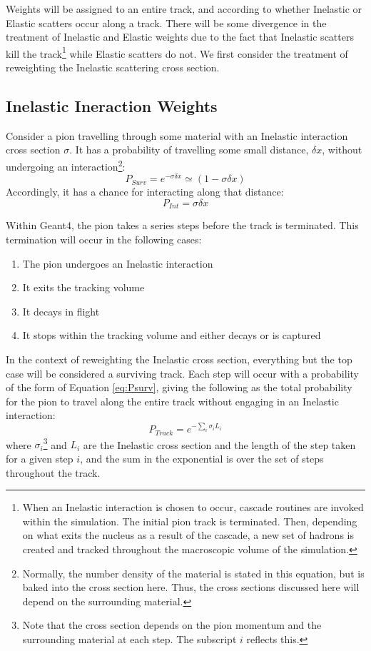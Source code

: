 \documentclass[12pt]{article}
\begin{document}
Weights will be assigned to an entire track, and according to whether Inelastic or Elastic scatters occur along a track. There will be some divergence in the treatment of Inelastic and Elastic weights due to the fact that Inelastic scatters kill the track\footnote{When an Inelastic interaction is chosen to occur, cascade routines are invoked within the simulation. The initial pion track is terminated. Then, depending on what exits the nucleus as a result of the cascade, a new set of hadrons is created and tracked throughout the macroscopic volume of the simulation.} while Elastic scatters do not. We first consider the treatment of reweighting the Inelastic scattering cross section.

\subsection{Inelastic Ineraction 
Weights}\label{subsec:inel_weights}

Consider a pion travelling through some material with an Inelastic interaction cross section $\sigma$. It has a probability of travelling some small distance, $\delta x$, without undergoing an interaction\footnote{Normally, the number density of the material is stated in this equation, but is baked into the cross section here. Thus, the cross sections discussed here will depend on the surrounding material.}:
\begin{equation}\label{eq:Psurv}
P_{Surv} = e^{- \sigma \delta x} \simeq (1 - \sigma \delta x)
\end{equation}
Accordingly, it has a chance for interacting along that distance:
\begin{equation}\label{eq:Pint}
P_{Int} = \sigma \delta x
\end{equation}

Within Geant4, the pion takes a series steps before the track is terminated. This termination will occur in the following cases:
\begin{enumerate}
\item The pion undergoes an Inelastic interaction
\item It exits the tracking volume
\item It decays in flight
\item It stops within the tracking volume and either decays or is captured
\end{enumerate}
In the context of reweighting the Inelastic cross section, everything but the top case will be considered a surviving track.
Each step will occur with a probability of the form of Equation \ref{eq:Psurv}, giving the following as the total probability for the pion to travel along the entire track without engaging in an Inelastic interaction:
\begin{equation}
P_{Track} =  e^{- \sum \limits_{i} \sigma_i L_i}
\end{equation} 
where $\sigma_i$\footnote{Note that the cross section depends on the pion momentum and the surrounding material at each step. The subscript $i$ reflects this.} and $L_i$ are the Inelastic cross section and the length of the step taken for a given step $i$, and the sum in the exponential is over the set of steps throughout the track.
\end{document}
